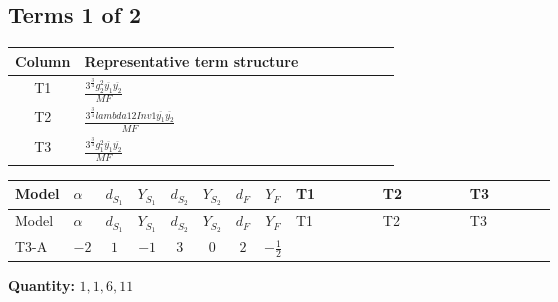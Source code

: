 \documentclass[8pt]{article}
\begin{document}
\begin{landscape}
\subsection*{Terms 1 of 2}
\begin{center}
\begin{tabular}{@{}c >{\raggedright\arraybackslash}p{0.82\linewidth}@{}}
\toprule
Column & Representative term structure \\
\midrule
T1 & \(\displaystyle \frac{3^{\frac{3}{4}} g_{2}^{2} \overline{y_{1}} \overline{y_{2}}}{MF}\) \\
\midrule
T2 & \(\displaystyle \frac{3^{\frac{3}{4}} lambda12Inv1 \overline{y_{1}} \overline{y_{2}}}{MF}\) \\
\midrule
T3 & \(\displaystyle \frac{3^{\frac{3}{4}} g_{1}^{2} \overline{y_{1}} \overline{y_{2}}}{MF}\) \\
\midrule
\bottomrule
\end{tabular}
\end{center}
\smallskip
\tiny
\begin{longtable}{@{}llcccccc >{\raggedright\arraybackslash}p{0.21\linewidth} >{\raggedright\arraybackslash}p{0.21\linewidth} >{\raggedright\arraybackslash}p{0.21\linewidth}@{}}
\toprule
Model & $\alpha$ & $d_{S_1}$ & $Y_{S_1}$ & $d_{S_2}$ & $Y_{S_2}$ & $d_F$ & $Y_F$ & T1 & T2 & T3 \\
\midrule
\endfirsthead
\toprule
Model & $\alpha$ & $d_{S_1}$ & $Y_{S_1}$ & $d_{S_2}$ & $Y_{S_2}$ & $d_F$ & $Y_F$ & T1 & T2 & T3 \\
\midrule
\endhead
T3-A & $-2$ & $1$ & $-1$ & $3$ & $0$ & $2$ & $-\frac{1}{2}$ & \scriptsize\adjustbox{max width=\linewidth}{$\begin{gathered} - \frac{17 \cdot 3^{\frac{3}{4}} g_{2}^{2} \overline{y_{1}} \overline{y_{2}}}{24 MF}\end{gathered}$} & \scriptsize\adjustbox{max width=\linewidth}{$\begin{gathered} - \frac{3^{\frac{3}{4}} lambda12Inv1 \overline{y_{1}} \overline{y_{2}}}{6 MF}\end{gathered}$} & \scriptsize\adjustbox{max width=\linewidth}{$\begin{gathered} - \frac{3^{\frac{3}{4}} g_{1}^{2} \overline{y_{1}} \overline{y_{2}}}{8 MF}\end{gathered}$} \\
\midrule
\bottomrule
\end{longtable}
\clearpage
\noindent\textbf{Quantity: }$\mathrm{1,1,6,11}$\par\smallskip

\end{landscape}
\end{document}
